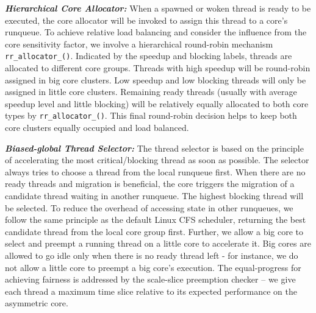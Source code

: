 \textbf{\textit{Hierarchical Core Allocator:}}
When a spawned or woken thread is ready to be executed, the core allocator will be invoked to assign this thread to a core's runqueue. To achieve relative load balancing and consider the influence from the core sensitivity factor, we involve a hierarchical round-robin mechanism \texttt{rr\_allocator\_()}. Indicated by the speedup and blocking labels, threads are allocated to different core groups. Threads with high speedup will be round-robin assigned in big core clusters. Low speedup and low blocking threads will only be assigned in little core clusters. 
Remaining ready threads (usually with average speedup level and little blocking) will be relatively equally allocated to both core types by \texttt{rr\_allocator\_()}. This final round-robin decision helps to keep both core clusters equally occupied and load balanced. 

\textbf{\textit{Biased-global Thread Selector:}}
The thread selector is based on the principle of accelerating the most critical/blocking thread as soon as possible. The selector always tries to choose a thread from the local runqueue first. When there are no ready threads and migration is beneficial, the core triggers the migration of a candidate thread waiting in another runqueue. The highest blocking thread will be selected.
To reduce the overhead of accessing state in other runqueues, we follow the same principle as the default Linux CFS scheduler, returning the best candidate thread from the local core group first.
Further, we allow a big core to select and preempt a running thread on a little core to accelerate it. Big cores are allowed to go idle only when there is no ready thread left - for instance, we do not allow a little core to preempt a big core's execution. 
The equal-progress for achieving fairness is addressed by the scale-slice preemption checker  -- we give each thread a maximum time slice relative to its expected performance on the asymmetric core.



